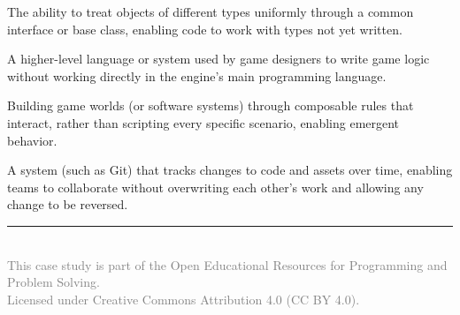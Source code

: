 \documentclass[11pt,letterpaper]{article}
\newcommand{\cscourse}{Programming and Problem Solving}
\begin{document}
\begin{glossarybox}
\begin{description}[leftmargin=!, labelwidth=3.6cm, font=\bfseries\color{cssecondary}]
    \item[Polymorphism] The ability to treat objects of different types uniformly through a common interface or base class, enabling code to work with types not yet written.

    \item[Scripting Layer] A higher-level language or system used by game designers to write game logic without working directly in the engine's main programming language.

    \item[Systemic Design] Building game worlds (or software systems) through composable rules that interact, rather than scripting every specific scenario, enabling emergent behavior.

    \item[Version Control] A system (such as Git) that tracks changes to code and assets over time, enabling teams to collaborate without overwriting each other's work and allowing any change to be reversed.
\end{description}
\end{glossarybox}

\vspace{5mm}

\begin{center}
\textcolor{csprimary}{\rule{0.6\textwidth}{0.5pt}}\\[3mm]
{\small\textcolor{gray}{This case study is part of the Open Educational Resources for \cscourse.\\
Licensed under Creative Commons Attribution 4.0 (CC BY 4.0).}}
\end{center}
\end{document}
